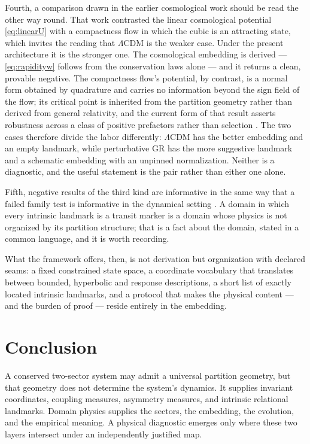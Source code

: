 \documentclass[11pt,a4paper]{article}
\theoremstyle{definition}
\theoremstyle{plain}
\theoremstyle{remark}
\begin{document}
Fourth, a comparison drawn in the earlier cosmological work should be read the
other way round. That work contrasted the linear cosmological potential
\eqref{eq:linearU} with a compactness flow in which the cubic is an attracting
state, which invites the reading that $\Lambda$CDM is the weaker case. Under the
present architecture it is the stronger one. The cosmological embedding is
derived --- \eqref{eq:rapidityw} follows from the conservation laws alone --- and
it returns a clean, provable negative. The compactness flow's potential, by
contrast, is a normal form obtained by quadrature and carries no information
beyond the sign field of the flow; its critical point is inherited from the
partition geometry rather than derived from general relativity, and the current
form of that result asserts robustness across a class of positive prefactors
rather than selection \cite{AltitudeRelax}. The two cases therefore divide the
labor differently: $\Lambda$CDM has the better embedding and an empty landmark,
while perturbative GR has the more suggestive landmark and a schematic embedding
with an unpinned normalization. Neither is a diagnostic, and the useful
statement is the pair rather than either one alone.

Fifth, negative results of the third kind are informative in the same way that
a failed family test is informative in the dynamical setting \cite{EffPot}. A
domain in which every intrinsic landmark is a transit marker is a domain whose
physics is not organized by its partition structure; that is a fact about the
domain, stated in a common language, and it is worth recording.

What the framework offers, then, is not derivation but organization with
declared seams: a fixed constrained state space, a coordinate vocabulary that
translates between bounded, hyperbolic and response descriptions, a
short list of exactly located intrinsic landmarks, and a protocol that makes
the physical content --- and the burden of proof --- reside entirely in the
embedding.

\section{Conclusion}
\label{sec:conclusion}

A conserved two-sector system may admit a universal partition geometry, but
that geometry does not determine the system's dynamics. It supplies invariant
coordinates, coupling measures, asymmetry measures, and intrinsic relational
landmarks. Domain physics supplies the sectors, the embedding, the evolution,
and the empirical meaning. A physical diagnostic emerges only where these two
layers intersect under an independently justified map.
\end{document}
